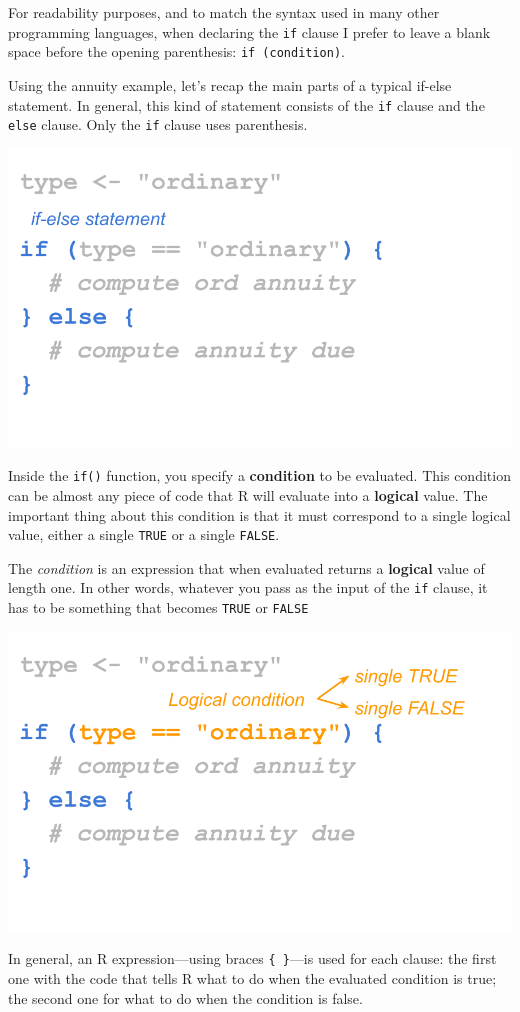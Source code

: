 \documentclass[
]{book}
\begin{document}
For readability purposes, and to match the syntax used in many other programming
languages, when declaring the \texttt{if} clause I prefer to leave a blank space before
the opening parenthesis: \texttt{if\ (condition)}.

Using the annuity example, let's recap the main parts of a typical if-else
statement. In general, this kind of statement consists of the \texttt{if} clause
and the \texttt{else} clause. Only the \texttt{if} clause uses parenthesis.

\begin{center}\includegraphics[width=0.5\linewidth]{images/conditionals/if-else-anatomy-2} \end{center}

Inside the \texttt{if()} function, you specify a \textbf{condition} to be
evaluated. This condition can be almost any piece of code that R will evaluate
into a \textbf{logical} value. The important thing about this condition is that it
must correspond to a single logical value, either a single \texttt{TRUE} or a single
\texttt{FALSE}.

The \emph{condition} is an expression that when evaluated returns
a \textbf{logical} value of length one. In other words, whatever you pass as the
input of the \texttt{if} clause, it has to be something that becomes \texttt{TRUE} or \texttt{FALSE}

\begin{center}\includegraphics[width=0.5\linewidth]{images/conditionals/if-else-anatomy-3} \end{center}

In general, an R expression---using braces \texttt{\{\ \}}---is used for each clause:
the first one with the code that tells R what to do when the evaluated
condition is true; the second one for what to do when the condition is false.
\end{document}
